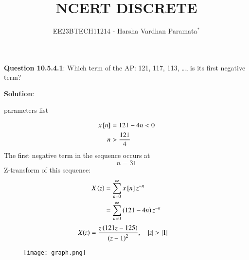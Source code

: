 \documentclass[journal,12pt,twocolumn]{IEEEtran}
\theoremstyle{remark}
\begin{document}

\vspace{3cm}

\title{NCERT DISCRETE}
\author{EE23BTECH11214 - Harsha Vardhan Paramata$^{*}$%
}
\maketitle
\newpage
\bigskip

\renewcommand{\thefigure}{\theenumi}
\renewcommand{\thetable}{\theenumi}

\textbf{Question 10.5.4.1}:
Which term of the AP: 121, 117, 113, \ldots, is its first negative term?

\textbf{Solution}:
\begin{table}[htbp]
\centering

\caption{parameters list}
\end{table}

\begin{align}
x{}\left[n\right] &= 121 - 4n < 0 \\
n &> \frac{121}{4} 
\end{align}
The first negative term in the sequence occurs at 
\[ n = 31 \]
Z-transform of this sequence:
\begin{align}
X\left(z\right) &= \sum_{n=0}^{\infty} x{}\left[n\right]z^{-n} \\
&= \sum_{n=0}^{\infty} \left(121 - 4n\right)z^{-n}
\end{align}
\begin{align}
    X(z) &= \frac{z\left(121z - 125\right)}{\left(z - 1\right)^2} ,\quad \left\vert z\right\vert > \left\vert1\right\vert
\end{align}
\pagebreak
\begin{figure}[!ht] 
\centering
\texttt{[image: graph.png]}
\label{fig:Graph1}
\end{figure}
\end{document}
